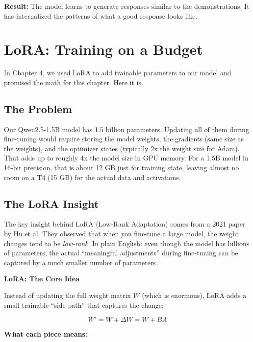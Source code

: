 \begin{chapterenv}
\begin{infobox}
\textbf{Result:} The model learns to generate responses similar to the demonstrations. It has internalized the patterns of what a good response looks like.
\end{infobox}

\section{LoRA: Training on a Budget}

In Chapter 4, we used LoRA to add trainable parameters to our model and promised the math for this chapter. Here it is.

\subsection{The Problem}

Our Qwen2.5-1.5B model has 1.5 billion parameters. Updating all of them during fine-tuning would require storing the model weights, the gradients (same size as the weights), and the optimizer states (typically 2x the weight size for Adam). That adds up to roughly 4x the model size in GPU memory. For a 1.5B model in 16-bit precision, that is about 12 GB just for training state, leaving almost no room on a T4 (15 GB) for the actual data and activations.

\subsection{The LoRA Insight}

The key insight behind LoRA (Low-Rank Adaptation) comes from a 2021 paper by Hu et al. They observed that when you fine-tune a large model, the weight changes tend to be \textit{low-rank}. In plain English: even though the model has billions of parameters, the actual ``meaningful adjustments'' during fine-tuning can be captured by a much smaller number of parameters.

\begin{infobox}
\textbf{LoRA: The Core Idea}

Instead of updating the full weight matrix $W$ (which is enormous), LoRA adds a small trainable ``side path'' that captures the change:

$$W' = W + \Delta W = W + BA$$

\textbf{What each piece means:}


\end{infobox}
\end{chapterenv}
